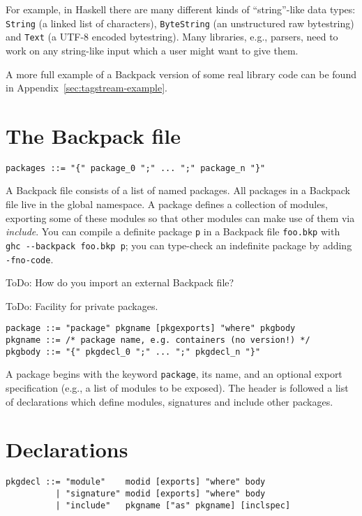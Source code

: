 \documentclass{article}
\newcommand{\Red}[1]{{\color{red} #1}}
\begin{document}
For example, in Haskell there are many different kinds of ``string''-like
data types: \verb|String| (a linked list of characters), \verb|ByteString|
(an unstructured raw bytestring) and \verb|Text| (a UTF-8 encoded bytestring).
Many libraries, e.g., parsers, need to work on any string-like input which
a user might want to give them.

A more full example of a Backpack version of some real library
code can be found in Appendix~\ref{sec:tagstream-example}.



\section{The Backpack file}

\begin{verbatim}
packages ::= "{" package_0 ";" ... ";" package_n "}"
\end{verbatim}

A Backpack file consists of a list of named packages.
All packages in a Backpack file live in the global namespace.
A package defines a collection of modules, exporting some of
these modules so that other modules can make use of them via
\emph{include}.  You can compile a definite package \verb|p| in a Backpack file \verb|foo.bkp|
with \verb|ghc --backpack foo.bkp p|; you can type-check an indefinite package by
adding \verb|-fno-code|.

\Red{ToDo: How do you import an external Backpack file?}

\Red{ToDo: Facility for private packages.}

\begin{verbatim}
package ::= "package" pkgname [pkgexports] "where" pkgbody
pkgname ::= /* package name, e.g. containers (no version!) */
pkgbody ::= "{" pkgdecl_0 ";" ... ";" pkgdecl_n "}"
\end{verbatim}

A package begins with the keyword \verb|package|, its name, and an
optional export specification (e.g., a list of modules to be exposed).
The header is followed a list of declarations which define modules,
signatures and include other packages.

\section{Declarations}

\begin{verbatim}
pkgdecl ::= "module"    modid [exports] "where" body
          | "signature" modid [exports] "where" body
          | "include"   pkgname ["as" pkgname] [inclspec]
\end{verbatim}
\end{document}
